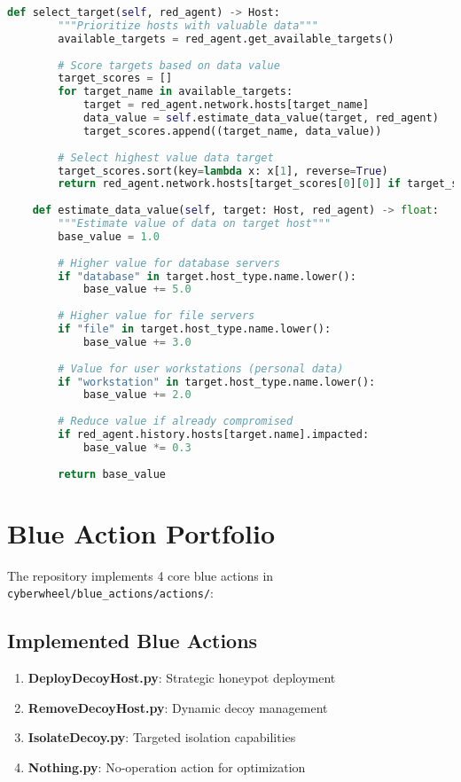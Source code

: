 \documentclass[12pt,a4paper]{article}
\begin{document}
\begin{lstlisting}[language=Python, caption=Red Agent Strategy Framework]
    def select_target(self, red_agent) -> Host:
        """Prioritize hosts with valuable data"""
        available_targets = red_agent.get_available_targets()
        
        # Score targets based on data value
        target_scores = []
        for target_name in available_targets:
            target = red_agent.network.hosts[target_name]
            data_value = self.estimate_data_value(target, red_agent)
            target_scores.append((target_name, data_value))
        
        # Select highest value data target
        target_scores.sort(key=lambda x: x[1], reverse=True)
        return red_agent.network.hosts[target_scores[0][0]] if target_scores else red_agent.current_host
        
    def estimate_data_value(self, target: Host, red_agent) -> float:
        """Estimate value of data on target host"""
        base_value = 1.0
        
        # Higher value for database servers
        if "database" in target.host_type.name.lower():
            base_value += 5.0
            
        # Higher value for file servers
        if "file" in target.host_type.name.lower():
            base_value += 3.0
            
        # Value for user workstations (personal data)
        if "workstation" in target.host_type.name.lower():
            base_value += 2.0
            
        # Reduce value if already compromised
        if red_agent.history.hosts[target.name].impacted:
            base_value *= 0.3
            
        return base_value
\end{lstlisting}

\section{Blue Action Portfolio}

The repository implements 4 core blue actions in \texttt{cyberwheel/blue\_actions/actions/}:

\subsection{Implemented Blue Actions}

\begin{enumerate}
    \item \textbf{DeployDecoyHost.py}: Strategic honeypot deployment
    \item \textbf{RemoveDecoyHost.py}: Dynamic decoy management  
    \item \textbf{IsolateDecoy.py}: Targeted isolation capabilities
    \item \textbf{Nothing.py}: No-operation action for optimization
\end{enumerate}
\end{document}
